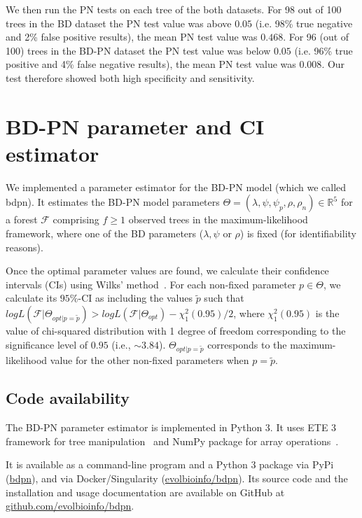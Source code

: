 \documentclass[a4paper,10pt]{article}
\begin{document}
We then run the PN tests on each tree of the both datasets. For 98 out of 100 trees in the BD dataset the PN test value was above $0.05$ (i.e. 98\% true negative and 2\% false positive results), the mean PN test value was $0.468$. For 96 (out of 100) trees in the BD-PN dataset the PN test value was below $0.05$ (i.e. 96\% true positive and 4\% false negative results), the mean PN test value was $0.008$.
Our test therefore showed both high specificity and sensitivity.
 

\section{BD-PN parameter and CI estimator}
We implemented a parameter estimator for the BD-PN model (which we called bdpn). It estimates the BD-PN model parameters  $\Theta = (\lambda,\psi,\psi_p,\rho,\rho_n) \in \mathbb{R}^5$ for a forest $\mathscr{F}$ comprising $f \geq 1$ observed trees in the maximum-likelihood framework, where one of the BD parameters ($\lambda,\psi$ or $\rho$) is fixed (for identifiability reasons). 

Once the optimal parameter values are found, we calculate their confidence intervals (CIs) using Wilks' method~\citep{Wilks1938}.
For each non-fixed parameter $p \in \Theta$, we calculate its $95\%$-CI as including the values $\tilde{p}$ such that $log L(\mathscr{F}|\Theta_{opt|p=\tilde{p}}) > log L(\mathscr{F}| \Theta_{opt}) - \chi^2_1(0.95) / 2$, where $\chi^2_1(0.95)$ is the value of chi-squared distribution with 1 degree of freedom corresponding to the significance level of $0.95$ (i.e., $\sim3.84$). $\Theta_{opt|p=\tilde{p}}$ corresponds to the maximum-likelihood value for the other non-fixed parameters when $p = \tilde{p}$. 

\subsection*{Code availability}
The BD-PN parameter estimator is implemented in Python 3. It uses ETE 3 framework for tree manipulation~\cite{Huerta-Cepas2016} and NumPy package for array operations~\cite{harris_array_2020}. 

It is available as a command-line program and a Python 3 package via PyPi (\href{https://pypi.org/project/bdpn}{bdpn}), and via Docker/Singularity (\href{https://hub.docker.com/r/evolbioinfo/bdpn/tags}{evolbioinfo/bdpn}). Its source code and the installation and usage documentation are available on GitHub at \href{https://github.com/evolbioinfo/bdpn}{github.com/evolbioinfo/bdpn}.
\end{document}
